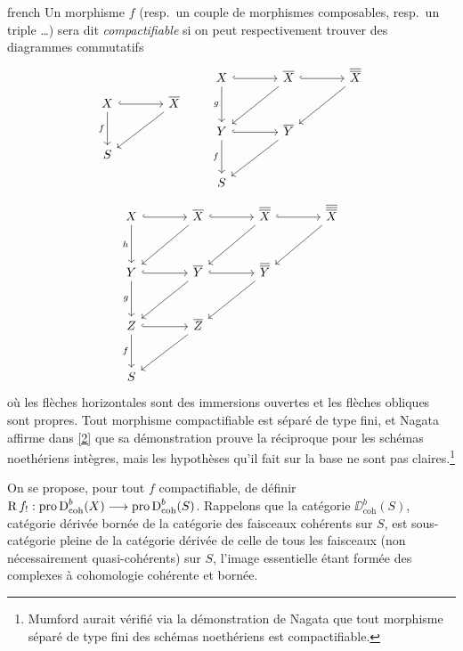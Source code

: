 \begin{hyphenrules}{french}
Un morphisme $f$ (resp.\ un couple de morphismes composables, resp.\ un triple \dots) sera dit \emph{compactifiable} si on peut respectivement trouver des diagrammes commutatifs
\[
\begin{tikzcd}[row sep=large,column sep=large]
X \ar[r,hook] \ar[d,"f"'] & \overline X \ar[dl] \\
S
\end{tikzcd}
\qquad
\begin{tikzcd}[row sep=large,column sep=large]
X \ar[r,hook] \ar[d,"g"'] & \overline X \ar[r,hook] \ar[dl]
 & \overline{\overline X} \ar[dl] \\
Y \ar[r,hook] \ar[d,"f"'] & \overline Y \ar[dl] \\
S
\end{tikzcd}
\]
\[
\begin{tikzcd}[row sep=large,column sep=large]
X \ar[r,hook] \ar[d,"h"'] & \overline X \ar[r,hook] \ar[dl]
 & \overline{\overline X} \ar[r,hook] \ar[dl]
 & \overline{\overline{\overline X}} \ar[dl] \\
Y \ar[r,hook] \ar[d,"g"'] & \overline Y \ar[r,hook] \ar[dl]
 & \overline{\overline Y} \ar[dl] \\
Z \ar[r,hook] \ar[d,"f"'] & \overline Z \ar[dl] \\
S
\end{tikzcd}
\]
o\`u les fl\`eches horizontales sont des immersions ouvertes et les fl\`eches obliques sont propres. Tout morphisme compactifiable est s\'epar\'e de type fini, et Nagata affirme dans \hyperref[app:bib2]{[2]} que sa d\'emonstration prouve la r\'eciproque pour les sch\'emas noeth\'eriens int\`egres, mais les hypoth\`eses qu'il fait sur la base ne sont pas claires.\footnote{Mumford aurait v\'erifi\'e via la d\'emonstration de Nagata que tout morphisme s\'epar\'e de type fini des sch\'emas noeth\'eriens est compactifiable.}

On se propose, pour tout $f$ compactifiable, de d\'efinir $\operatorname{R} f_{!}: \operatorname{pro}\operatorname{D}_{\operatorname{coh}}^{b}(X) \longrightarrow \operatorname{pro}\operatorname{D}_{\operatorname{coh}}^{b}(S)$. Rappelons que la cat\'egorie $\DD_{\operatorname{coh}}^{b}(S)$, cat\'egorie d\'eriv\'ee born\'ee de la cat\'egorie des faisceaux coh\'erents sur $S$, est sous-cat\'egorie pleine de la cat\'egorie d\'eriv\'ee de celle de tous les faisceaux (non n\'ecessairement quasi-coh\'erents) sur $S$, l'image essentielle \'etant form\'ee des complexes \`a cohomologie coh\'erente et born\'ee.


\end{hyphenrules}
